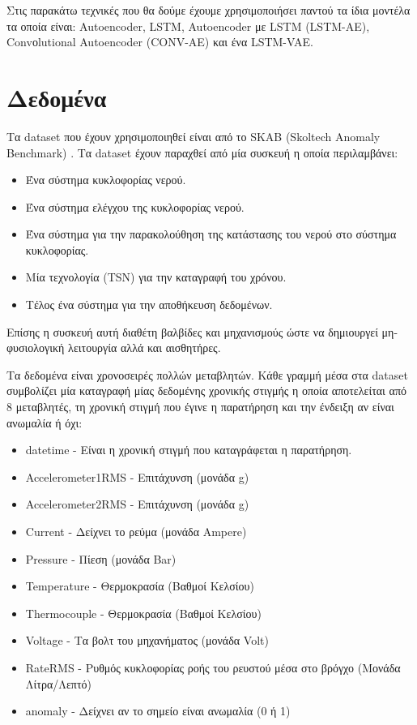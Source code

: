 \documentclass[a4paper,12pt]{report}
\theoremstyle{definitionNODot}
\begin{document}
	Στις παρακάτω τεχνικές που θα δούμε έχουμε χρησιμοποιήσει παντού τα ίδια μοντέλα τα οποία είναι: Autoencoder, LSTM, Autoencoder με LSTM (LSTM-AE), Convοlutional Autoencoder (CONV-AE) και ένα LSTM-VAE.
	\section{Δεδομένα}
	
	Tα dataset που έχουν χρησιμοποιηθεί είναι από το SKAB (Skoltech Anomaly Benchmark) \cite{skabdataset}. Τα dataset έχουν παραχθεί από μία συσκευή η οποία περιλαμβάνει:
	
	\begin{itemize}
		\item Ένα σύστημα κυκλοφορίας νερού.
		\item Ένα σύστημα ελέγχου της κυκλοφορίας νερού.
		\item Ένα σύστημα για την παρακολούθηση της κατάστασης του νερού στο σύστημα κυκλοφορίας.
		\item Μία τεχνολογία (TSN) για την καταγραφή του χρόνου.
		\item Τέλος ένα σύστημα για την αποθήκευση δεδομένων.
	\end{itemize}
	Επίσης η συσκευή αυτή διαθέτη βαλβίδες και μηχανισμούς ώστε να δημιουργεί μη-φυσιολογική λειτουργία αλλά και αισθητήρες.
	
	Τα δεδομένα είναι χρονοσειρές πολλών μεταβλητών. Κάθε γραμμή μέσα στα dataset συμβολίζει μία καταγραφή μίας δεδομένης χρονικής στιγμής η οποία αποτελείται από 8 μεταβλητές, τη χρονική στιγμή που έγινε η παρατήρηση και την ένδειξη αν είναι ανωμαλία ή όχι:
	
	\begin{itemize}
		\item datetime - Είναι η χρονική στιγμή που καταγράφεται η παρατήρηση.
		\item Accelerometer1RMS - Επιτάχυνση (μονάδα g)
		\item Accelerometer2RMS - Επιτάχυνση (μονάδα g)
		\item Current - Δείχνει το ρεύμα (μονάδα Ampere)
		\item Pressure - Πίεση (μονάδα Bar)
		\item Temperature - Θερμοκρασία (Βαθμοί Κελσίου)
		\item Thermocouple - Θερμοκρασία (Βαθμοί Κελσίου)
		\item Voltage - Τα βολτ του μηχανήματος (μονάδα Volt)
		\item RateRMS - Ρυθμός κυκλοφορίας ροής του ρευστού μέσα στο βρόγχο (Μονάδα Λίτρα/Λεπτό)
		\item anomaly - Δείχνει αν το σημείο είναι ανωμαλία (0 ή 1)
	\end{itemize}
	
\end{document}

